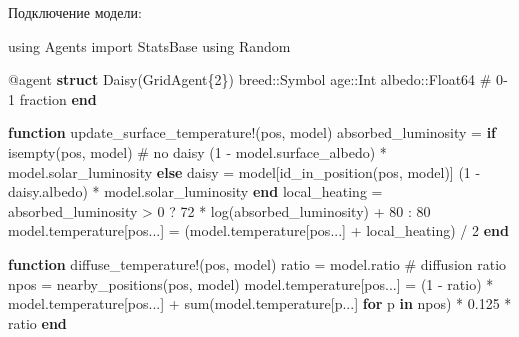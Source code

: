 \documentclass[
  english,
  russian,
  12pt,
  a4paper,
  DIV=11,
  numbers=noendperiod]{scrreprt}
\newenvironment{Shaded}{\begin{snugshade}}{\end{snugshade}}
\newcommand{\BuiltInTok}[1]{\textcolor[rgb]{0.00,0.23,0.31}{#1}}
\newcommand{\CommentTok}[1]{\textcolor[rgb]{0.37,0.37,0.37}{#1}}
\newcommand{\ControlFlowTok}[1]{\textcolor[rgb]{0.00,0.23,0.31}{\textbf{#1}}}
\newcommand{\DataTypeTok}[1]{\textcolor[rgb]{0.68,0.00,0.00}{#1}}
\newcommand{\FloatTok}[1]{\textcolor[rgb]{0.68,0.00,0.00}{#1}}
\newcommand{\FunctionTok}[1]{\textcolor[rgb]{0.28,0.35,0.67}{#1}}
\newcommand{\ImportTok}[1]{\textcolor[rgb]{0.00,0.46,0.62}{#1}}
\newcommand{\KeywordTok}[1]{\textcolor[rgb]{0.00,0.23,0.31}{\textbf{#1}}}
\newcommand{\NormalTok}[1]{\textcolor[rgb]{0.00,0.23,0.31}{#1}}
\newcommand{\OperatorTok}[1]{\textcolor[rgb]{0.37,0.37,0.37}{#1}}
\newcommand{\PreprocessorTok}[1]{\textcolor[rgb]{0.68,0.00,0.00}{#1}}
\begin{document}
Подключение модели:

\begin{Shaded}
\begin{Highlighting}[]
\ImportTok{using} \BuiltInTok{Agents}
\ImportTok{import} \BuiltInTok{StatsBase}
\ImportTok{using} \BuiltInTok{Random}

\PreprocessorTok{@agent} \KeywordTok{struct} \FunctionTok{Daisy}\NormalTok{(GridAgent\{}\FloatTok{2}\NormalTok{\})}
\NormalTok{    breed}\OperatorTok{::}\DataTypeTok{Symbol}
\NormalTok{    age}\OperatorTok{::}\DataTypeTok{Int}
\NormalTok{    albedo}\OperatorTok{::}\DataTypeTok{Float64 }\CommentTok{\# 0{-}1 fraction}
\KeywordTok{end}

\KeywordTok{function} \FunctionTok{update\_surface\_temperature!}\NormalTok{(pos, model)}
\NormalTok{    absorbed\_luminosity }\OperatorTok{=} \ControlFlowTok{if} \FunctionTok{isempty}\NormalTok{(pos, model) }\CommentTok{\# no daisy}
\NormalTok{        (}\FloatTok{1} \OperatorTok{{-}}\NormalTok{ model.surface\_albedo) }\OperatorTok{*}\NormalTok{ model.solar\_luminosity}
    \ControlFlowTok{else}
\NormalTok{        daisy }\OperatorTok{=}\NormalTok{ model[}\FunctionTok{id\_in\_position}\NormalTok{(pos, model)]}
\NormalTok{        (}\FloatTok{1} \OperatorTok{{-}}\NormalTok{ daisy.albedo) }\OperatorTok{*}\NormalTok{ model.solar\_luminosity}
    \ControlFlowTok{end}
\NormalTok{    local\_heating }\OperatorTok{=}\NormalTok{ absorbed\_luminosity }\OperatorTok{\textgreater{}} \FloatTok{0}\NormalTok{ ? }\FloatTok{72} \OperatorTok{*} \FunctionTok{log}\NormalTok{(absorbed\_luminosity) }\OperatorTok{+} \FloatTok{80} \OperatorTok{:} \FloatTok{80}
\NormalTok{    model.temperature[pos}\OperatorTok{...}\NormalTok{] }\OperatorTok{=}\NormalTok{ (model.temperature[pos}\OperatorTok{...}\NormalTok{] }\OperatorTok{+}\NormalTok{ local\_heating) }\OperatorTok{/} \FloatTok{2}
\KeywordTok{end}

\KeywordTok{function} \FunctionTok{diffuse\_temperature!}\NormalTok{(pos, model)}
\NormalTok{    ratio }\OperatorTok{=}\NormalTok{ model.ratio }\CommentTok{\# diffusion ratio}
\NormalTok{    npos }\OperatorTok{=} \FunctionTok{nearby\_positions}\NormalTok{(pos, model)}
\NormalTok{    model.temperature[pos}\OperatorTok{...}\NormalTok{] }\OperatorTok{=}
\NormalTok{        (}\FloatTok{1} \OperatorTok{{-}}\NormalTok{ ratio) }\OperatorTok{*}\NormalTok{ model.temperature[pos}\OperatorTok{...}\NormalTok{] }\OperatorTok{+}
        \FunctionTok{sum}\NormalTok{(model.temperature[p}\OperatorTok{...}\NormalTok{] }\ControlFlowTok{for}\NormalTok{ p }\KeywordTok{in}\NormalTok{ npos) }\OperatorTok{*} \FloatTok{0.125} \OperatorTok{*}\NormalTok{ ratio}
\ControlFlowTok{end}


\end{Highlighting}
\end{Shaded}
\end{document}
